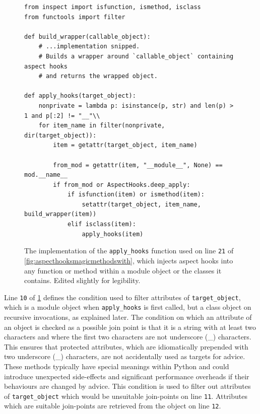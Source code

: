 \begin{figure}
    \centering
    \begin{lstlisting}[style=footnotesize_python]
from inspect import isfunction, ismethod, isclass
from functools import filter

def build_wrapper(callable_object):
    # ...implementation snipped.
    # Builds a wrapper around `callable_object` containing aspect hooks
    # and returns the wrapped object.

def apply_hooks(target_object):
    nonprivate = lambda p: isinstance(p, str) and len(p) > 1 and p[:2] != "__"\\
    for item_name in filter(nonprivate, dir(target_object)):
        item = getattr(target_object, item_name)

        from_mod = getattr(item, "__module__", None) == mod.__name__
        if from_mod or AspectHooks.deep_apply:
            if isfunction(item) or ismethod(item):
                setattr(target_object, item_name, build_wrapper(item))
            elif isclass(item):
                apply_hooks(item)
    \end{lstlisting}
    \caption{The implementation of the \lstinline{apply_hooks} function used on
    line \texttt{21} of \cref{fig:aspecthooksmagicmethodswith}, which injects
    aspect hooks into any function or method within a module object or the
    classes it contains. Edited slightly for legibility.}
    \label{fig:apply_hooks_to_module}
\end{figure}

Line \texttt{10} of \cref{fig:apply_hooks_to_module} defines the condition used
to filter attributes of \lstinline{target_object}, which is a module object when
\lstinline{apply_hooks} is first called, but a class object on recursive
invocations, as explained later. The condition on which an attribute of an
object is checked as a possible join point is that it is a string with at least
two characters and where the first two characters are not underscore (\_)
characters. This ensures that protected attributes, which are idiomatically
prepended with two underscore (\_) characters, are not accidentally used as
targets for advice. These methods typically have special meanings within Python
and could introduce unexpected side-effects and significant performance
overheads if their behaviours are changed by advice. This condition is used to
filter out attributes of \lstinline{target_object} which would be unsuitable
join-points on line \texttt{11}. Attributes which are suitable join-points are
retrieved from the object on line \texttt{12}.


